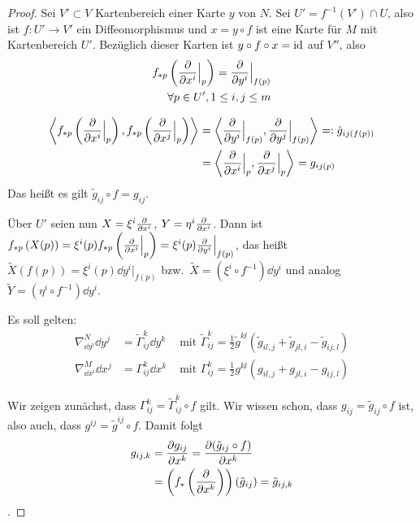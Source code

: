 \documentclass{skript}
\begin{document}
\begin{proof}
  Sei $V'\subset V$ Kartenbereich einer Karte $y$ von $N$. Sei $U' =
  f^{-1}(V')\cap U$, also ist $f:U'\to V'$ ein Diffeomorphismus und $x = y\circ
  f$ ist eine Karte für $M$ mit Kartenbereich $U'$. Bezüglich dieser Karten ist
  $y\circ f \circ x = \operatorname{id}$ auf $V''$, also
  \begin{align*}
    f_{*p}\left( \del{i}\Big|_p \right) = \dd{y^i}{}\Big|_{f(p)} \\
    \forall p\in U', 1\le i,j \le m
  \end{align*}

  \begin{align*}
    \sprod{f_{*p}\left( \del{i}\Big|_p \right), f_{*p}\left(
    \del{j}\Big|_p \right)} &= \sprod{\dd{y^i}{}\Big|_{f(p)},
    \dd{y^j}{}\Big|_{f(p)}} =:\tilde g_{ij\left( f(p) \right)} \\
    &= \sprod{\del{i}\Big|_p, \del{j}\Big|_p} = g_{ij(p)}
  \end{align*}
  Das heißt es gilt $\tilde g_{ij} \circ f = g_{ij}$.

  Über $U'$ seien nun $X=\xi^i\del{i}$, $Y=\eta^i\del{i}$. Dann ist
  $f_{*p}\left( X(p) \right) = \xi^i(p)f_{*p}\left( \del{i}\Big|_p \right) =
  \xi^i(p)\dd{y^i}{}\Big|_{f(p)}$, das heißt $\tilde X(f(p)) =
  \xi^i(p)\dd{y^i}{}\Big|_{f(p)}$ bzw.\ $\tilde X = \left( \xi^i\circ
  f^{-1} \right)\dd{y^i}{}$ und analog $\tilde Y = \left( \eta^i\circ
  f^{-1} \right)\dd{y^i}{}$.

  Es soll gelten:
  \begin{align*}
    \nabla_{\dd{y^i}{}}^N\dd{y^j}{} &= \tilde \Gamma_{ij}^k \dd{y^k}{} &\text{ mit
    } \tilde\Gamma^k_{ij} = \frac{1}{2}\tilde g^{kl}(\tilde g_{il,j} + \tilde
    g_{jl,i} - \tilde g_{ij,l}) \\
    \nabla_{\dd{x^i}{}}^M\dd{x^j}{} &= \Gamma_{ij}^k \dd{x^k}{} &\text{ mit
    } \Gamma^k_{ij} = \frac{1}{2}g^{kl}(g_{il,j} + g_{jl,i} - g_{ij,l})
  \end{align*}

  Wir zeigen zunächst, dass $\Gamma^k_{ij} = \tilde \Gamma^k_{ij}\circ f$ gilt.
  Wir wissen schon, dass $g_{ij} = \tilde g_{ij}\circ f$ ist, also auch, dass
  $g^{ij} = \tilde g^{ij} \circ f$. Damit folgt
  \begin{align*}
    g_{ij,k} &= \dd{x^k}{g_{ij}} = \dd{x^k}{(\tilde g_{ij}\circ f)} \\
    &= \left( f_{*}\left( \del{k} \right) \right)(\tilde g_{ij}) = \tilde
    g_{ij,k}
  \end{align*}.


\end{proof}
\end{document}
